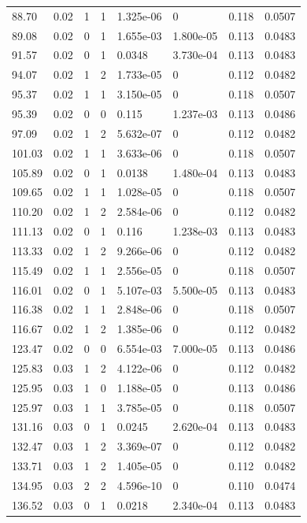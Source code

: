 \documentclass[preview]{standalone}
\begin{document}
{{{\begin{tabular}{L{1.2cm}C{1.2cm} C{0.3cm}C{0.5cm} C{1.4cm}C{1.4cm} C{1.4cm}C{1.4cm}}
  88.70  &  0.02  & 1     &  1 &  1.325e-06  & 0  & 0.118 &  0.0507   \\ 
  89.08  &  0.02  & 0     &  1 &  1.655e-03  & 1.800e-05  & 0.113 &  0.0483   \\ 
  91.57  &  0.02  & 0     &  1 &  0.0348  & 3.730e-04  & 0.113 &  0.0483   \\ 
  94.07  &  0.02  & 1     &  2 &  1.733e-05  & 0  & 0.112 &  0.0482   \\ 
  95.37  &  0.02  & 1     &  1 &  3.150e-05  & 0  & 0.118 &  0.0507   \\ 
  95.39  &  0.02  & 0     &  0 &  0.115  & 1.237e-03  & 0.113 &  0.0486   \\ 
  97.09  &  0.02  & 1     &  2 &  5.632e-07  & 0  & 0.112 &  0.0482   \\ 
  101.03  &  0.02  & 1     &  1 &  3.633e-06  & 0  & 0.118 &  0.0507   \\ 
  105.89  &  0.02  & 0     &  1 &  0.0138  & 1.480e-04  & 0.113 &  0.0483   \\ 
  109.65  &  0.02  & 1     &  1 &  1.028e-05  & 0  & 0.118 &  0.0507   \\ 
  110.20  &  0.02  & 1     &  2 &  2.584e-06  & 0  & 0.112 &  0.0482   \\ 
  111.13  &  0.02  & 0     &  1 &  0.116  & 1.238e-03  & 0.113 &  0.0483   \\ 
  113.33  &  0.02  & 1     &  2 &  9.266e-06  & 0  & 0.112 &  0.0482   \\ 
  115.49  &  0.02  & 1     &  1 &  2.556e-05  & 0  & 0.118 &  0.0507   \\ 
  116.01  &  0.02  & 0     &  1 &  5.107e-03  & 5.500e-05  & 0.113 &  0.0483   \\ 
  116.38  &  0.02  & 1     &  1 &  2.848e-06  & 0  & 0.118 &  0.0507   \\ 
  116.67  &  0.02  & 1     &  2 &  1.385e-06  & 0  & 0.112 &  0.0482   \\ 
  123.47  &  0.02  & 0     &  0 &  6.554e-03  & 7.000e-05  & 0.113 &  0.0486   \\ 
  125.83  &  0.03  & 1     &  2 &  4.122e-06  & 0  & 0.112 &  0.0482   \\ 
  125.95  &  0.03  & 1     &  0 &  1.188e-05  & 0  & 0.113 &  0.0486   \\ 
  125.97  &  0.03  & 1     &  1 &  3.785e-05  & 0  & 0.118 &  0.0507   \\ 
  131.16  &  0.03  & 0     &  1 &  0.0245  & 2.620e-04  & 0.113 &  0.0483   \\ 
  132.47  &  0.03  & 1     &  2 &  3.369e-07  & 0  & 0.112 &  0.0482   \\ 
  133.71  &  0.03  & 1     &  2 &  1.405e-05  & 0  & 0.112 &  0.0482   \\ 
  134.95  &  0.03  & 2     &  2 &  4.596e-10  & 0  & 0.110 &  0.0474   \\ 
  136.52  &  0.03  & 0     &  1 &  0.0218  & 2.340e-04  & 0.113 &  0.0483   \\ 
\hline 
\end{tabular} 

}}}
\end{document}
